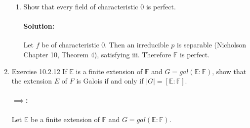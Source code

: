 \documentclass{article}
\begin{document}
\begin{enumerate}
\begin{enumerate}
        \item Show that every field of characteristic 0 is perfect.
          \paragraph{Solution:} Let $f$ be of characteristic $0$. Then an irreducible $p$ is separable 
          (Nicholson Chapter 10, Theorem 4), satisfying iii. Therefore $\mathbb{F}$ is perfect.
      \end{enumerate}
\item Exercise 10.2.12 If $\mathbb{E}$ is a finite extension of $\mathbb{F}$ and 
    $G = gal( \mathbb{E} : \mathbb{F})$, show that the extension $E$ of $F$ is Galois if and only if 
    $|G| = [\mathbb{E} : \mathbb{F}]$.
    \paragraph{$\implies$:} Let $\mathbb{E}$ be a finite extension of $\mathbb{F}$ and 
    $G=gal(\mathbb{E}:\mathbb{F})$. 
\end{enumerate}
\end{document}
